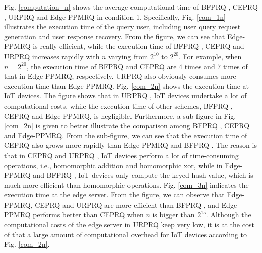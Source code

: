 \documentclass[IEEE JOURNAL OF BIOMEDICAL AND HEALTH INFORMATICS]{IEEEtran}
\begin{document}
Fig. \ref{computation_n} shows the average computational time of BFPRQ \cite{mahdikhani2020IoT}, CEPRQ \cite{hasan2020IoT}, URPRQ \cite{mahdikhani2020using} and Edge-PPMRQ in condition 1. Specifically, Fig. \ref{com_1n} illustrates the execution time of the query user, including user query request generation and user response recovery. From the figure, we can see that Edge-PPMRQ is really efficient, while the execution time of BFPRQ \cite{mahdikhani2020IoT}, CEPRQ \cite{hasan2020IoT} and URPRQ \cite{mahdikhani2020using} increases rapidly with $n$ varying from $2^{10}$ to $2^{20}$. For example, when $n=2^{20}$, the execution time of BFPRQ \cite{mahdikhani2020IoT} and CEPRQ \cite{hasan2020IoT} are $4$ times and $7$ times of that in Edge-PPMRQ, respectively. URPRQ \cite{mahdikhani2020using} also obviously consumes more execution time than Edge-PPMRQ. Fig. \ref{com_2n} shows the execution time at IoT devices. The figure shows that in URPRQ \cite{mahdikhani2020using}, IoT devices undertake a lot of computational costs, while the execution time of other schemes, BFPRQ \cite{mahdikhani2020IoT}, CEPRQ \cite{hasan2020IoT} and Edge-PPMRQ, is negligible. Furthermore, a sub-figure in Fig. \ref{com_2n} is given to better illustrate the comparison among BFPRQ \cite{mahdikhani2020IoT}, CEPRQ \cite{hasan2020IoT} and Edge-PPMRQ. From the sub-figure, we can see that the execution time of CEPRQ \cite{hasan2020IoT} also grows more rapidly than Edge-PPMRQ and BFPRQ \cite{mahdikhani2020IoT}. The reason is that in CEPRQ \cite{hasan2020IoT} and URPRQ \cite{mahdikhani2020using}, IoT devices perform a lot of time-consuming operations, i.e., homomorphic addition and homomorphic xor, while in Edge-PPMRQ and BFPRQ \cite{mahdikhani2020IoT}, IoT devices only compute the keyed hash value, which is much more efficient than homomorphic operations. Fig. \ref{com_3n} indicates the execution time at the edge server. From the figure, we can observe that Edge-PPMRQ, CEPRQ \cite{hasan2020IoT} and URPRQ \cite{mahdikhani2020using} are more efficient than BFPRQ \cite{mahdikhani2020IoT}, and  Edge-PPMRQ performs better than CEPRQ \cite{hasan2020IoT} when $n$ is bigger than $2^{15}$. Although the computational costs of the edge server in URPRQ \cite{mahdikhani2020using} keep very low, it is at the cost of that a large amount of computational overhead for IoT devices  according to Fig. \ref{com_2n}. 
\end{document}
